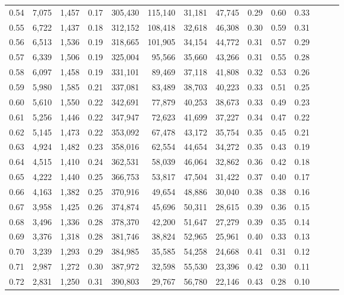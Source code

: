 \begin{tabular}{rrrrrrrrrrrrrr}
0.54 &  7,075 &  1,457 &  0.17 &  305,430 &  115,140 &  31,181 &  47,745 &  0.29 &  0.60 &      0.33 \\
0.55 &  6,722 &  1,437 &  0.18 &  312,152 &  108,418 &  32,618 &  46,308 &  0.30 &  0.59 &      0.31 \\
0.56 &  6,513 &  1,536 &  0.19 &  318,665 &  101,905 &  34,154 &  44,772 &  0.31 &  0.57 &      0.29 \\
0.57 &  6,339 &  1,506 &  0.19 &  325,004 &   95,566 &  35,660 &  43,266 &  0.31 &  0.55 &      0.28 \\
0.58 &  6,097 &  1,458 &  0.19 &  331,101 &   89,469 &  37,118 &  41,808 &  0.32 &  0.53 &      0.26 \\
0.59 &  5,980 &  1,585 &  0.21 &  337,081 &   83,489 &  38,703 &  40,223 &  0.33 &  0.51 &      0.25 \\
0.60 &  5,610 &  1,550 &  0.22 &  342,691 &   77,879 &  40,253 &  38,673 &  0.33 &  0.49 &      0.23 \\
0.61 &  5,256 &  1,446 &  0.22 &  347,947 &   72,623 &  41,699 &  37,227 &  0.34 &  0.47 &      0.22 \\
0.62 &  5,145 &  1,473 &  0.22 &  353,092 &   67,478 &  43,172 &  35,754 &  0.35 &  0.45 &      0.21 \\
0.63 &  4,924 &  1,482 &  0.23 &  358,016 &   62,554 &  44,654 &  34,272 &  0.35 &  0.43 &      0.19 \\
0.64 &  4,515 &  1,410 &  0.24 &  362,531 &   58,039 &  46,064 &  32,862 &  0.36 &  0.42 &      0.18 \\
0.65 &  4,222 &  1,440 &  0.25 &  366,753 &   53,817 &  47,504 &  31,422 &  0.37 &  0.40 &      0.17 \\
0.66 &  4,163 &  1,382 &  0.25 &  370,916 &   49,654 &  48,886 &  30,040 &  0.38 &  0.38 &      0.16 \\
0.67 &  3,958 &  1,425 &  0.26 &  374,874 &   45,696 &  50,311 &  28,615 &  0.39 &  0.36 &      0.15 \\
0.68 &  3,496 &  1,336 &  0.28 &  378,370 &   42,200 &  51,647 &  27,279 &  0.39 &  0.35 &      0.14 \\
0.69 &  3,376 &  1,318 &  0.28 &  381,746 &   38,824 &  52,965 &  25,961 &  0.40 &  0.33 &      0.13 \\
0.70 &  3,239 &  1,293 &  0.29 &  384,985 &   35,585 &  54,258 &  24,668 &  0.41 &  0.31 &      0.12 \\
0.71 &  2,987 &  1,272 &  0.30 &  387,972 &   32,598 &  55,530 &  23,396 &  0.42 &  0.30 &      0.11 \\
0.72 &  2,831 &  1,250 &  0.31 &  390,803 &   29,767 &  56,780 &  22,146 &  0.43 &  0.28 &      0.10 \\

\end{tabular}
